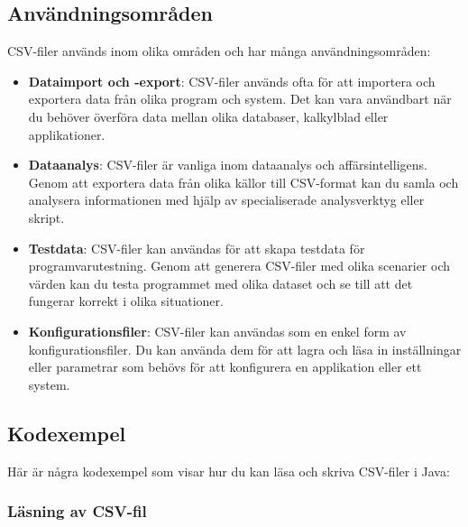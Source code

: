 \hypertarget{anvuxe4ndningsomruxe5den}{%
\subsection{Användningsområden}\label{anvuxe4ndningsomruxe5den}}

CSV-filer används inom olika områden och har många användningsområden:

\begin{itemize}
\tightlist
\item
  \textbf{Dataimport och -export}: CSV-filer används ofta för att
  importera och exportera data från olika program och system. Det kan
  vara användbart när du behöver överföra data mellan olika databaser,
  kalkylblad eller applikationer.
\item
  \textbf{Dataanalys}: CSV-filer är vanliga inom dataanalys och
  affärsintelligens. Genom att exportera data från olika källor till
  CSV-format kan du samla och analysera informationen med hjälp av
  specialiserade analysverktyg eller skript.
\item
  \textbf{Testdata}: CSV-filer kan användas för att skapa testdata för
  programvarutestning. Genom att generera CSV-filer med olika scenarier
  och värden kan du testa programmet med olika dataset och se till att
  det fungerar korrekt i olika situationer.
\item
  \textbf{Konfigurationsfiler}: CSV-filer kan användas som en enkel form
  av konfigurationsfiler. Du kan använda dem för att lagra och läsa in
  inställningar eller parametrar som behövs för att konfigurera en
  applikation eller ett system.
\end{itemize}

\hypertarget{kodexempel}{%
\subsection{Kodexempel}\label{kodexempel}}

Här är några kodexempel som visar hur du kan läsa och skriva CSV-filer i
Java:

\hypertarget{luxe4sning-av-csv-fil}{%
\subsubsection{Läsning av CSV-fil}\label{luxe4sning-av-csv-fil}}

